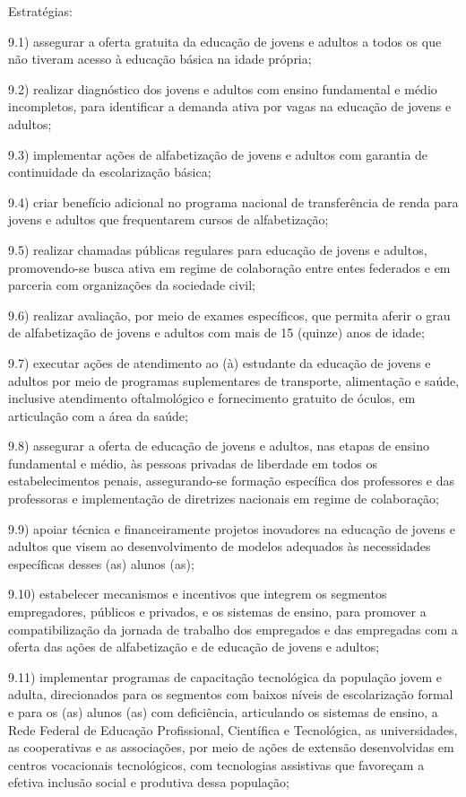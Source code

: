 \documentclass[
]{book}
\begin{document}
Estratégias:

9.1) assegurar a oferta gratuita da educação de jovens e adultos a todos os que não tiveram acesso à educação básica na idade própria;

9.2) realizar diagnóstico dos jovens e adultos com ensino fundamental e médio incompletos, para identificar a demanda ativa por vagas na educação de jovens e adultos;

9.3) implementar ações de alfabetização de jovens e adultos com garantia de continuidade da escolarização básica;

9.4) criar benefício adicional no programa nacional de transferência de renda para jovens e adultos que frequentarem cursos de alfabetização;

9.5) realizar chamadas públicas regulares para educação de jovens e adultos, promovendo-se busca ativa em regime de colaboração entre entes federados e em parceria com organizações da sociedade civil;

9.6) realizar avaliação, por meio de exames específicos, que permita aferir o grau de alfabetização de jovens e adultos com mais de 15 (quinze) anos de idade;

9.7) executar ações de atendimento ao (à) estudante da educação de jovens e adultos por meio de programas suplementares de transporte, alimentação e saúde, inclusive atendimento oftalmológico e fornecimento gratuito de óculos, em articulação com a área da saúde;

9.8) assegurar a oferta de educação de jovens e adultos, nas etapas de ensino fundamental e médio, às pessoas privadas de liberdade em todos os estabelecimentos penais, assegurando-se formação específica dos professores e das professoras e implementação de diretrizes nacionais em regime de colaboração;

9.9) apoiar técnica e financeiramente projetos inovadores na educação de jovens e adultos que visem ao desenvolvimento de modelos adequados às necessidades específicas desses (as) alunos (as);

9.10) estabelecer mecanismos e incentivos que integrem os segmentos empregadores, públicos e privados, e os sistemas de ensino, para promover a compatibilização da jornada de trabalho dos empregados e das empregadas com a oferta das ações de alfabetização e de educação de jovens e adultos;

9.11) implementar programas de capacitação tecnológica da população jovem e adulta, direcionados para os segmentos com baixos níveis de escolarização formal e para os (as) alunos (as) com deficiência, articulando os sistemas de ensino, a Rede Federal de Educação Profissional, Científica e Tecnológica, as universidades, as cooperativas e as associações, por meio de ações de extensão desenvolvidas em centros vocacionais tecnológicos, com tecnologias assistivas que favoreçam a efetiva inclusão social e produtiva dessa população;
\end{document}
